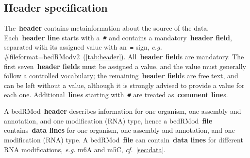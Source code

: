 \documentclass[11pt]{article}
\begin{document}
\subsection{Header specification}\label{sec:header}

The~\textbf{header} contains metainformation about the source of the data. Each~\textbf{header line} starts with a~\texttt{\#} and contains a
mandatory~\textbf{header field}, separated with its assigned value with an~\texttt{=} sign, \textit{e.g.} 
\textsf{\#fileformat=}bedRModv2~(\autoref{tab:header}). All~\textbf{header field}s are mandatory. The first seven~\textbf{header field}s must be assigned a
value, and the value must generally follow a controlled vocabulary; the remaining~\textbf{header field}s are free text, and 
can be left without a value, although it is strongly advised to provide a value for each one. Additional~\textbf{line}s starting with~\texttt{\#} are treated as~\textbf{comment line}s.

A \ac{bedRMod}~\textbf{header} describes information  for one organism, one assembly and annotation, and one modification (RNA) type, hence a \ac{bedRMod}~\textbf{file} contains~\textbf{data lines} for one organism, one assembly and annotation, and one modification (RNA) type. A \ac{bedRMod}~\textbf{file} can 
contain~\textbf{data lines} for different RNA modifications, \textit{e.g.} m6A and m5C, \textit{cf.}~\autoref{sec:data}.
\end{document}
